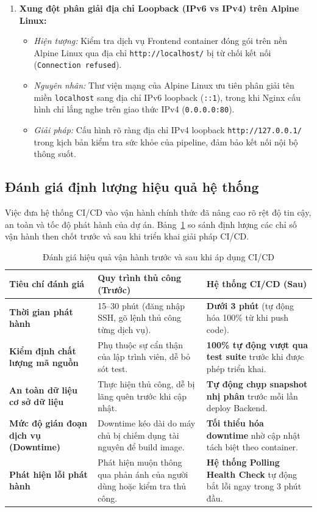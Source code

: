 \begin{enumerate}
    \item \textbf{Xung đột phân giải địa chỉ Loopback (IPv6 vs IPv4) trên Alpine Linux:}
    \begin{itemize}[noitemsep]
        \item \textit{Hiện tượng:} Kiểm tra dịch vụ Frontend container đóng gói trên nền Alpine Linux qua địa chỉ \texttt{http://localhost/} bị từ chối kết nối (\texttt{Connection refused}).
        \item \textit{Nguyên nhân:} Thư viện mạng của Alpine Linux ưu tiên phân giải tên miền \texttt{localhost} sang địa chỉ IPv6 loopback (\texttt{::1}), trong khi Nginx cấu hình chỉ lắng nghe trên giao thức IPv4 (\texttt{0.0.0.0:80}).
        \item \textit{Giải pháp:} Cấu hình rõ ràng địa chỉ IPv4 loopback \texttt{http://127.0.0.1/} trong kịch bản kiểm tra sức khỏe của pipeline, đảm bảo kết nối nội bộ thông suốt.
    \end{itemize}
\end{enumerate}

\subsection{Đánh giá định lượng hiệu quả hệ thống}

Việc đưa hệ thống CI/CD vào vận hành chính thức đã nâng cao rõ rệt độ tin cậy, an toàn và tốc độ phát hành của dự án. Bảng~\ref{tab:cicd_evaluation} so sánh định lượng các chỉ số vận hành then chốt trước và sau khi triển khai giải pháp CI/CD.

\begin{table}[htbp]
\centering
\small
\caption{Đánh giá hiệu quả vận hành trước và sau khi áp dụng CI/CD}
\label{tab:cicd_evaluation}
\renewcommand{\arraystretch}{1.3}
\begin{tabularx}{\textwidth}{|p{3.5cm}|p{4.8cm}|X|}
\hline
\textbf{Tiêu chí đánh giá} & \textbf{Quy trình thủ công (Trước)} & \textbf{Hệ thống CI/CD (Sau)} \\
\hline
\textbf{Thời gian phát hành} &
15--30 phút (đăng nhập SSH, gõ lệnh thủ công từng dịch vụ). &
\textbf{Dưới 3 phút} (tự động hóa 100\% từ khi push code). \\
\hline
\textbf{Kiểm định chất lượng mã nguồn} &
Phụ thuộc sự cẩn thận của lập trình viên, dễ bỏ sót test. &
\textbf{100\% tự động vượt qua test suite} trước khi được phép triển khai. \\
\hline
\textbf{An toàn dữ liệu cơ sở dữ liệu} &
Thực hiện thủ công, dễ bị lãng quên trước khi cập nhật. &
\textbf{Tự động chụp snapshot nhị phân} trước mỗi lần deploy Backend. \\
\hline
\textbf{Mức độ gián đoạn dịch vụ (Downtime)} &
Downtime kéo dài do máy chủ bị chiếm dụng tài nguyên để build image. &
\textbf{Tối thiểu hóa downtime} nhờ cập nhật tách biệt theo container. \\
\hline
\textbf{Phát hiện lỗi phát hành} &
Phát hiện muộn thông qua phản ánh của người dùng hoặc kiểm tra thủ công. &
\textbf{Hệ thống Polling Health Check} tự động bắt lỗi ngay trong 3 phút đầu. \\
\hline
\end{tabularx}
\end{table}

